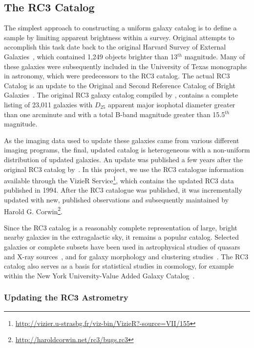 \documentclass[authoryear, 12pt, 5p, times]{elsarticle}
\begin{document}
\subsection{The RC3 Catalog\label{sec:rc3}}

The simplest approach to constructing a uniform galaxy catalog is to  define a sample by limiting apparent brightness within a survey. Original attempts to accomplish this task date back to the original Harvard Survey of External Galaxies~\citep{shapley-ames}, which contained 1,249 objects brighter than 13$^{th}$ magnitude. Many of these galaxies were subsequently included in the University of Texas monographs in astronomy, which were predecessors to the RC3 catalog. The actual RC3 Catalog is an update to the Original and Second Reference Catalog of Bright Galaxies~\citep{rc2}. The original RC3 galaxy catalog compiled by \citet{rc3}, contains a  complete listing of 23,011 galaxies with $D_{25}$ apparent major isophotal diameter greater than one arcminute and with a total B-band magnitude greater than 15.5$^{th}$ magnitude. 

As the imaging data used to update these galaxies  came from various different imaging programs, the final, updated catalog is heterogeneous with a non-uniform distribution of updated galaxies. An update was published a few years after the original RC3 catalog by~\citet{rc3-94}. In this project, we use the RC3 catalogue information available through the VizieR Service\footnote{\url{http://vizier.u-strasbg.fr/viz-bin/VizieR?-source=VII/155}},  which contains the updated RC3 data published in 1994. After the RC3 catalogue was published, it was incrementally updated with new, published observations and subsequently maintained by Harold G. Corwin\footnote{\url{http://haroldcorwin.net/rc3/bugs.rc3}}. 

Since the RC3 catalog  is a reasonably complete representation of large, bright nearby galaxies in the extragalactic sky, it remains a popular catalog. Selected galaxies or complete subsets have been used in astrophysical studies of quasars and X-ray sources~\citep[e.g.,][]{walton-rc3}, and for galaxy morphology and clustering studies~\citep[e.g.,][]{best-rc3, knapen-rc3}.  The RC3 catalog also serves as a basis for statistical studies  in cosmology, for example within the New York University-Value Added Galaxy Catalog~\citep{nyuvagc}.

\subsubsection{Updating the RC3 Astrometry\label{sec:position}}
\end{document}
